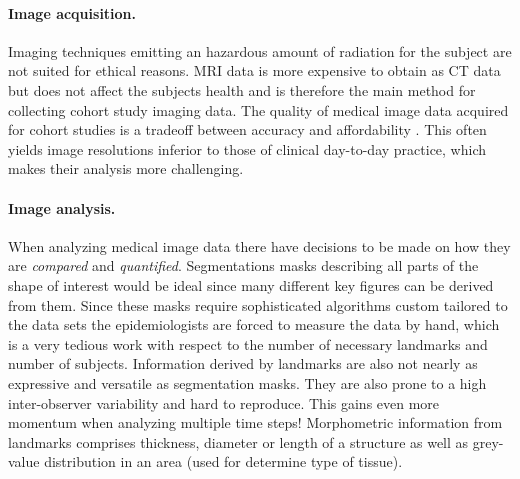 \documentclass[journal]{style/vgtc}           %
\begin{document}
\paragraph{Image acquisition.} Imaging techniques emitting an hazardous amount of radiation for the subject are not suited for ethical reasons.
%
MRI data is more expensive to obtain as CT data but does not affect the subjects health and is therefore the main method for collecting cohort study imaging data.
%
The quality of medical image data acquired for cohort studies is a tradeoff between accuracy and affordability \cite{Preim2014}.
%
This often yields image resolutions inferior to those of clinical day-to-day practice, which makes their analysis more challenging.

\paragraph{Image analysis.} When analyzing medical image data there have decisions to be made on how they are \emph{compared} and \emph{quantified}.
%
Segmentations masks describing all parts of the shape of interest would be ideal since many different key figures can be derived from them.
%
Since these masks require sophisticated algorithms custom tailored to the data sets the epidemiologists are forced to measure the data by hand, which is a very tedious work with respect to the number of necessary landmarks and number of subjects.
%
Information derived by landmarks are also not nearly as expressive and versatile as segmentation masks.
%
They are also prone to a high inter-observer variability and hard to reproduce.
%
This gains even more momentum when analyzing multiple time steps!
%
Morphometric information from landmarks comprises thickness, diameter or length of a structure as well as grey-value distribution in an area (used for determine type of tissue).

\end{document}
